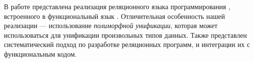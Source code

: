

В работе представлена реализация реляционного языка программирования \miniKanren{}, встроенного в функциональный язык \OCaml{}.
Отличительная особенность нашей реализации --- использование \emph{полиморфной унификации}, которая может использоваться для унификации произвольных типов данных.
Также представлен систематический подход по разработке реляционных программ, и интеграции их с функциональным кодом.

